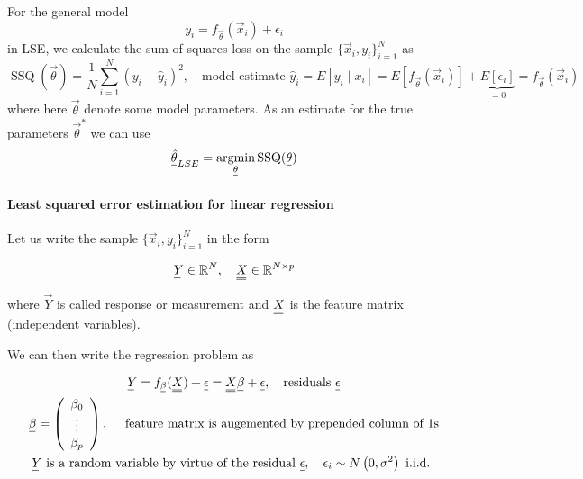 For the general model
\begin{equation}
    y_i = f_\vec{\theta}(\vec{x}_i) + \epsilon_i
\end{equation}
in LSE, we calculate the sum of squares loss on the sample $\{ \vec{x}_i,y_i \}_{i=1}^N$ as
\begin{equation}
    \operatorname{SSQ}(\vec{\theta}) = \frac{1}{N} \sum_{i=1}^{N} (y_i - \hat{y}_i)^2, \quad \text{model estimate } \hat{y}_i = E\left[y_i \mid x_i\right]=E\left[f_{\vec{\theta}}\left(\vec{x}_i\right)\right]+\underbrace{E\left[\epsilon_i\right]}_{=0}=f_{\vec{\theta}}\left(\vec{x}_i\right)
\end{equation}
where here $\vec{\theta}$ denote some model parameters. As an estimate for the true parameters $\vec{\theta}^*$ we can use
\begin{equation}
    \vec{\hat{\theta}}_{LSE} = \argmin_{\vec{\theta}} \operatorname{SSQ}(\vec{\theta})
\end{equation}

\paragraph*{Least squared error estimation for linear regression} Let us write the sample $\{ \vec{x}_i,y_i \}_{i=1}^N$ in the form

\begin{equation}
    \vec{Y} \in \mathbb{R}^N, \quad \mat{X} \in \mathbb{R}^{N\times p}
\end{equation}

where $\vec{Y}$ is called response or measurement and $\mat{X}$ is the feature matrix (independent variables).

We can then write the regression problem as

\begin{equation}
    \begin{gathered}
        \vec{Y} = f_\vec{\beta}(\mat{X}) + \vec{\epsilon} = \mat{X}\vec{\beta} + \vec{\epsilon}, \quad \text{residuals } \vec{\epsilon} \\
        \vec{\beta}=\left(\begin{array}{c}
            \beta_0 \\
            \vdots \\
            \beta_p
            \end{array}\right), \quad \text { feature matrix is augemented by prepended column of } 1 \text{s} \\
            \vec{Y} \text { is a random variable by virtue of the residual } \vec{\epsilon}, \quad \epsilon_i \sim N\left(0, \sigma^2\right) \text { i.i.d. }
    \end{gathered}
\end{equation}


